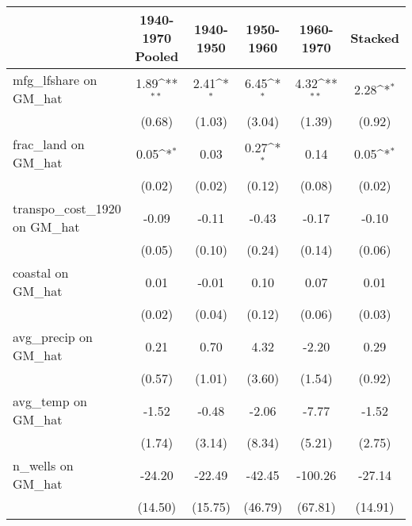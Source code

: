 \begin{table}[htbp]\centering
\def\sym#1{\ifmmode^{#1}\else\(^{#1}\)\fi}
\caption{}
\begin{tabular}{l*{5}{c}}
\toprule
                &\multicolumn{1}{c}{1940-1970 Pooled}&\multicolumn{1}{c}{1940-1950}&\multicolumn{1}{c}{1950-1960}&\multicolumn{1}{c}{1960-1970}&\multicolumn{1}{c}{Stacked}\\
\midrule
mfg\_lfshare on GM\_hat&     1.89\sym{**} &     2.41\sym{*}  &     6.45\sym{*}  &     4.32\sym{**} &     2.28\sym{*}  \\
                &   (0.68)         &   (1.03)         &   (3.04)         &   (1.39)         &   (0.92)         \\
\addlinespace
frac\_land on GM\_hat&     0.05\sym{*}  &     0.03         &     0.27\sym{*}  &     0.14         &     0.05\sym{*}  \\
                &   (0.02)         &   (0.02)         &   (0.12)         &   (0.08)         &   (0.02)         \\
\addlinespace
transpo\_cost\_1920 on GM\_hat&    -0.09         &    -0.11         &    -0.43         &    -0.17         &    -0.10         \\
                &   (0.05)         &   (0.10)         &   (0.24)         &   (0.14)         &   (0.06)         \\
\addlinespace
coastal on GM\_hat&     0.01         &    -0.01         &     0.10         &     0.07         &     0.01         \\
                &   (0.02)         &   (0.04)         &   (0.12)         &   (0.06)         &   (0.03)         \\
\addlinespace
avg\_precip on GM\_hat&     0.21         &     0.70         &     4.32         &    -2.20         &     0.29         \\
                &   (0.57)         &   (1.01)         &   (3.60)         &   (1.54)         &   (0.92)         \\
\addlinespace
avg\_temp on GM\_hat&    -1.52         &    -0.48         &    -2.06         &    -7.77         &    -1.52         \\
                &   (1.74)         &   (3.14)         &   (8.34)         &   (5.21)         &   (2.75)         \\
\addlinespace
n\_wells on GM\_hat&   -24.20         &   -22.49         &   -42.45         &  -100.26         &   -27.14         \\
                &  (14.50)         &  (15.75)         &  (46.79)         &  (67.81)         &  (14.91)         \\

\end{tabular}
\end{table}
